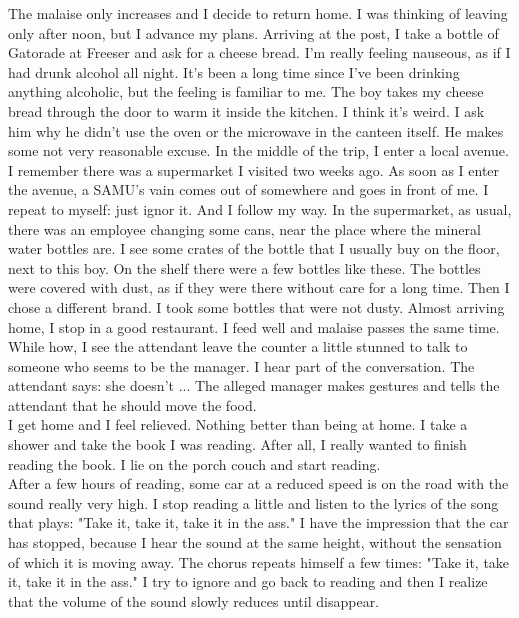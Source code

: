 \documentclass[11pt]{book}
\begin{document}
The malaise only increases and I decide to return home. I was thinking of leaving only after noon, but I advance my plans. Arriving at the post, I take a bottle of Gatorade at Freeser and ask for a cheese bread. I'm really feeling nauseous, as if I had drunk alcohol all night. It's been a long time since I've been drinking anything alcoholic, but the feeling is familiar to me. The boy takes my cheese bread through the door to warm it inside the kitchen. I think it's weird. I ask him why he didn't use the oven or the microwave in the canteen itself. He makes some not very reasonable excuse. In the middle of the trip, I enter a local avenue. I remember there was a supermarket I visited two weeks ago. As soon as I enter the avenue, a SAMU's vain comes out of somewhere and goes in front of me. I repeat to myself: just ignor it. And I follow my way. In the supermarket, as usual, there was an employee changing some cans, near the place where the mineral water bottles are. I see some crates of the bottle that I usually buy on the floor, next to this boy. On the shelf there were a few bottles like these. The bottles were covered with dust, as if they were there without care for a long time. Then I chose a different brand. I took some bottles that were not dusty. Almost arriving home, I stop in a good restaurant. I feed well and malaise passes the same time. While how, I see the attendant leave the counter a little stunned to talk to someone who seems to be the manager. I hear part of the conversation. The attendant says: she doesn't ... The alleged manager makes gestures and tells the attendant that he should move the food.\\

I get home and I feel relieved. Nothing better than being at home. I take a shower and take the book I was reading. After all, I really wanted to finish reading the book. I lie on the porch couch and start reading. \\

After a few hours of reading, some car at a reduced speed is on the road with the sound really very high. I stop reading a little and listen to the lyrics of the song that plays: "Take it, take it, take it in the ass." I have the impression that the car has stopped, because I hear the sound at the same height, without the sensation of which it is moving away. The chorus repeats himself a few times: "Take it, take it, take it in the ass." I try to ignore and go back to reading and then I realize that the volume of the sound slowly reduces until disappear. \\
\end{document}
